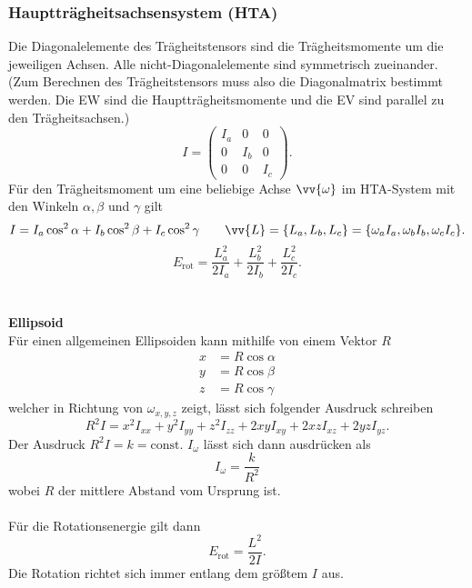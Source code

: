 \documentclass[a4paper,12pt]{article}
\numberwithin{equation}{section}
\begin{document}
\subsubsection{Hauptträgheitsachsensystem (HTA)}
Die Diagonalelemente des Trägheitstensors sind die Trägheitsmomente um die jeweiligen Achsen. Alle nicht-Diagonalelemente sind symmetrisch zueinander. (Zum Berechnen des Trägheitstensors muss also die Diagonalmatrix bestimmt werden. Die EW sind die Hauptträgheitsmomente und die EV sind parallel zu den Trägheitsachsen.)
\[ 
        I=\left(\begin{matrix} %
                        I_a&0&0\\
                        0&I_b&0\\
                        0&0&I_c
        \end{matrix}\right)
.\] 
Für den Trägheitsmoment um eine beliebige Achse $\vv{\omega }$ im HTA-System mit den Winkeln $\alpha ,\beta $ und $\gamma $ gilt
\[ 
        I=I_a\cos ^2\alpha +I_b \cos ^2\beta +I_c\cos ^2\gamma \qquad \vv{L}=\{L_a,L_b,L_c\}=\{\omega _aI_a,\omega _bI_b,\omega _cI_c\}
.\] 
\[ 
        E_{\text{rot}}=\dfrac{L_a^2}{2I_a}+\dfrac{L_b^2}{2I_b}+\dfrac{L_c^2}{2I_c}
.\] 
\\\hfill\\\textbf{Ellipsoid}\\ 
Für einen allgemeinen Ellipsoiden kann mithilfe von einem Vektor $R$ 
\begin{align*} %
        x&=R\cos \alpha \\
        y&=R\cos \beta \\
        z&=R\cos \gamma 
\end{align*}
welcher in Richtung von $\omega _{x,y,z}$ zeigt, lässt sich folgender Ausdruck schreiben
\[ 
        R^2I=x^2I_{xx}+y^2I_{yy}+z^2I_{zz}+2xyI_{xy}+2xzI_{xz}+2yzI_{yz}
.\] 
Der Ausdruck $R^2I=k=\text{const}$. $I_\omega $ lässt sich dann ausdrücken als
\[ 
        I_\omega =\dfrac{k}{R^2}
\] 
wobei $R$ der mittlere Abstand vom Ursprung ist.\\\\
Für die Rotationsenergie gilt dann
\[ 
        E_{\text{rot}}=\dfrac{L^2}{2I}
.\] 
Die Rotation richtet sich immer entlang dem größtem $I$ aus.
\end{document}
